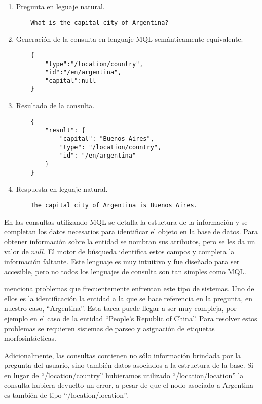 \begin{example}\label{QALD-etapas}\hfill
    \begin{enumerate}
        \item Pregunta en leguaje natural.
            \begin{lstlisting}
    What is the capital city of Argentina?
            \end{lstlisting}
        \item Generación de la consulta en lenguaje MQL semánticamente equivalente.
            \begin{lstlisting}
    {
        "type":"/location/country",
        "id":"/en/argentina",
        "capital":null
    }
            \end{lstlisting}
        \item Resultado de la consulta.
            \begin{lstlisting}
    {
        "result": {
            "capital": "Buenos Aires",
            "type": "/location/country",
            "id": "/en/argentina"
        }
    }
            \end{lstlisting}
        \item Respuesta en leguaje natural.
            \begin{lstlisting}
    The capital city of Argentina is Buenos Aires.
            \end{lstlisting}
    \end{enumerate}
\end{example}

En las consultas utilizando MQL se detalla la estuctura de la información y se completan los datos necesarios para identificar el objeto en la base de datos. Para obtener información sobre la entidad se nombran sus atributos, pero se les da un valor de $null$. El motor de búsqueda identifica estos campos y completa la información faltante. Este lenguaje es muy intuitivo y fue diseñado para ser accesible, pero no todos los lenguajes de consulta son tan simples como MQL.

\citet{ungerQALD} menciona problemas que frecuentemente enfrentan este tipo de sistemas. Uno de ellos es la identificación la entidad a la que se hace referencia en la pregunta, en nuestro caso, ``Argentina''. Esta tarea puede llegar a ser muy compleja, por ejemplo en el caso de la entidad ``People's Republic of China''. Para resolver estos problemas se requieren sistemas de parseo y asignación de etiquetas morfosintácticas.

Adicionalmente, las consultas contienen no sólo información brindada por la pregunta del usuario, sino también datos asociados a la estructura de la base. Si en lugar de ``/location/country'' hubieramos utilizado ``/location/location'' la consulta hubiera devuelto un error, a pesar de que el nodo asociado a Argentina es también de tipo ``/location/location''.

